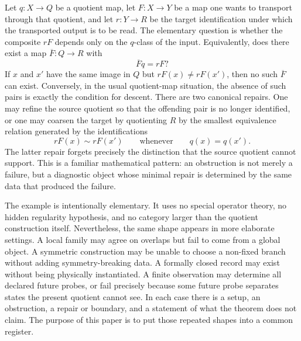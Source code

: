 \documentclass[11pt]{article}
\theoremstyle{definition}
\begin{document}
Let \(q:X\to Q\) be a quotient map, let \(F:X\to Y\) be a map one
wants to transport through that quotient, and let \(r:Y\to R\) be the
target identification under which the transported output is to be
read.  The elementary question is whether the composite \(rF\)
depends only on the \(q\)-class of the input.  Equivalently, does
there exist a map \(\overline F:Q\to R\) with
\[
  \overline F q = rF?
\]
If \(x\) and \(x'\) have the same image in \(Q\) but \(rF(x)\ne
rF(x')\), then no such \(\overline F\) can exist.  Conversely, in
the usual quotient-map situation, the absence of such pairs is
exactly the condition for descent.  There are two canonical repairs.
One may refine the source quotient so that the offending pair is no
longer identified, or one may coarsen the target by quotienting \(R\)
by the smallest equivalence relation generated by the identifications
\[
  rF(x)\sim rF(x')
  \qquad\text{whenever}\qquad
  q(x)=q(x').
\]
The latter repair forgets precisely the distinction that the source
quotient cannot support.  This is a familiar mathematical pattern:
an obstruction is not merely a failure, but a diagnostic object whose
minimal repair is determined by the same data that produced the
failure.

The example is intentionally elementary.  It uses no special
operator theory, no hidden regularity hypothesis, and no category
larger than the quotient construction itself.  Nevertheless, the
same shape appears in more elaborate settings.  A local family may
agree on overlaps but fail to come from a global object.  A symmetric
construction may be unable to choose a non-fixed branch without
adding symmetry-breaking data.  A formally closed record may exist
without being physically instantiated.  A finite observation may
determine all declared future probes, or fail precisely because some
future probe separates states the present quotient cannot see.  In
each case there is a setup, an obstruction, a repair or boundary, and
a statement of what the theorem does not claim.  The purpose of this
paper is to put those repeated shapes into a common register.
\end{document}

